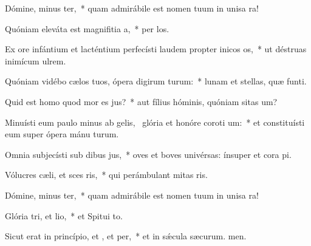 \item Dómine, minus ter,~* quam admirábile est nomen tuum in unisa ra!
\item Quóniam eleváta est magnifitia a,~* per los.
\item Ex ore infántium et lacténtium perfecísti laudem propter inicos os,~* ut déstruas inimícum  ulrem.
\item Quóniam vidébo cælos tuos, ópera digirum turum:~* lunam et stellas, quæ  funti.
\item Quid est homo quod mor es jus?~* aut fílius hóminis, quóniam sitas um?
\item Minuísti eum paulo minus ab gelis,~\pscross{} glória et honóre coroti um:~* et constituísti eum super ópera mánu turum.
\item Omnia subjecísti sub dibus jus,~* oves et boves univérsas: ínsuper et cora pi.
\item Vólucres cæli, et sces ris,~* qui perámbulant mitas ris.
\item Dómine, minus ter,~* quam admirábile est nomen tuum in unisa ra!
\item Glória tri, et lio,~* et Spitui to.
\item Sicut erat in princípio, et , et per,~* et in sǽcula sæcurum. men.
